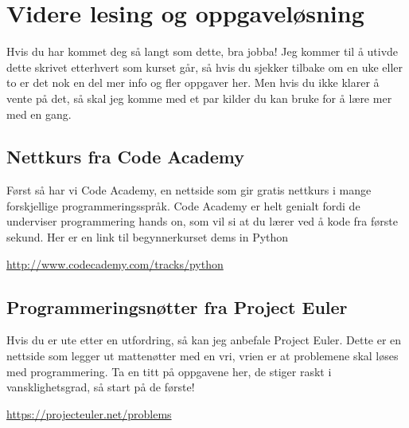 \documentclass[a4paper, 11pt, notitlepage]{article}
\begin{document}







\section*{Videre lesing og oppgaveløsning}

Hvis du har kommet deg så langt som dette, bra jobba! Jeg kommer til å utivde dette skrivet etterhvert som kurset går, så hvis du sjekker tilbake om en uke eller to er det nok en del mer info og fler oppgaver her. Men hvis du ikke klarer å vente på det, så skal jeg komme med et par kilder du kan bruke for å lære mer med en gang.

\subsection*{Nettkurs fra Code Academy}

Først så har vi Code Academy, en nettside som gir gratis nettkurs i mange forskjellige programmeringsspråk. Code Academy er helt genialt fordi de underviser programmering hands on, som vil si at du lærer ved å kode fra første sekund. Her er en link til begynnerkurset dems in Python

\url{http://www.codecademy.com/tracks/python}


\subsection*{Programmeringsnøtter fra Project Euler}

Hvis du er ute etter en utfordring, så kan jeg anbefale Project Euler. Dette er en nettside som legger ut mattenøtter med en vri, vrien er at problemene skal løses med programmering. Ta en titt på oppgavene her, de stiger raskt i vansklighetsgrad, så start på de første!

\url{https://projecteuler.net/problems}




\end{document}
